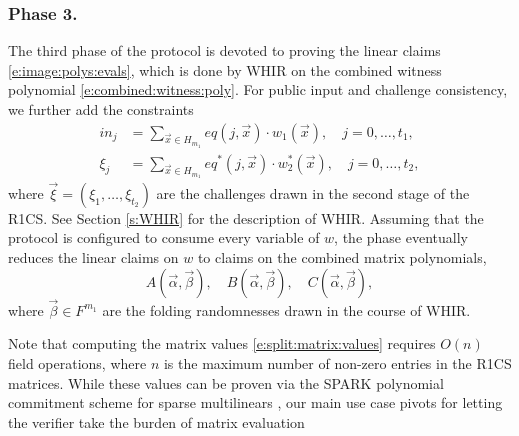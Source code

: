 
\subsubsection{Phase 3.}
The third phase of the protocol is devoted to proving the linear claims \eqref{e:image:polys:evals}, which is done by WHIR on the combined witness polynomial \eqref{e:combined:witness:poly}.
For public input and challenge consistency, we further add the constraints
\begin{align}
\label{e:input:w1:constraint}
in_j &= \sum_{\vec x\in H_{m_1}} eq(j,\vec x)\cdot w_1(\vec x), \quad j=0,\ldots, t_1,
\\
\label{e:input:w2:constraint}
\xi_j & = \sum_{\vec x\in H_{m_1}} eq^*(j,\vec x)\cdot w_2^*(\vec x), \quad j=0,\ldots, t_2,
\end{align}
where $\vec\xi = (\xi_1,\ldots, \xi_{t_2})$ are the challenges drawn in the second stage of the R1CS.
See Section \ref{s:WHIR} for the description of WHIR.
Assuming that the protocol is configured to consume every variable of $w$, 
the phase eventually reduces the linear claims on $w$ to claims on the combined matrix polynomials, 
\begin{equation}
\label{e:split:matrix:values}
A(\vec\alpha,\vec\beta), 
\quad 
B(\vec\alpha,\vec\beta), 
\quad 
C(\vec\alpha,\vec\beta),
\end{equation}
where $\vec\beta \in F^{m_1}$ are the folding randomnesses drawn in the course of WHIR. 

Note that computing the matrix values \eqref{e:split:matrix:values} requires $O(n)$ field operations, where $n$ is the maximum number of non-zero entries in the R1CS matrices. 
While these values can be proven via the SPARK polynomial commitment scheme for sparse multilinears \cite{Spartan}, our main use case pivots for letting the verifier take the burden of matrix evaluation

